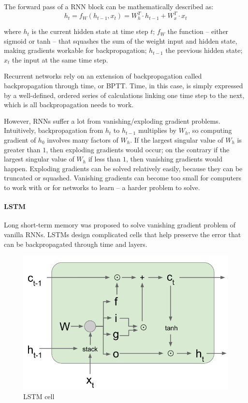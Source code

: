 \documentclass{article} %
\begin{document}
The forward pass of a RNN block can be mathematically described as:
\begin{equation}
h_t=f_W(h_{t-1},x_t)=W_h^T \cdot h_{t-1} + W_x^T \cdot x_t
\label{eqn:rnn}
\end{equation}

where $h_t$ is the current hidden state at time step $t$; $f_W$ the function -- either sigmoid or tanh -- that squashes the sum of the weight input and hidden state,  making gradients workable for backpropagation; $h_{t-1}$ the previous hidden state; $x_t$ the input at the same time step.

Recurrent networks rely on an extension of backpropagation called backpropagation through time, or BPTT. Time, in this case, is simply expressed by a well-defined, ordered series of calculations linking one time step to the next, which is all backpropagation needs to work.

However, RNNs suffer a lot from vanishing/exploding gradient problems. Intuitively, backpropagation from $h_t$ to $h_{t-1}$ multiplies by $W_h$, so computing gradient of $h_0$ involves many factors of $W_h$. If the largest singular value of $W_h$ is greater than $1$, then exploding gradients would occur; on the contrary if the largest singular value of $W_h$ if less than $1$, then vanishing gradients would happen. Exploding gradients can be solved relatively easily, because they can be truncated or squashed. Vanishing gradients can become too small for computers to work with or for networks to learn – a harder problem to solve. 

\paragraph{LSTM}
Long short-term memory was proposed to solve vanishing gradient problem of vanilla RNNs. LSTMs design complicated cells that help preserve the error that can be backpropagated through time and layers.

\begin{figure}[H]
	\centering
	\includegraphics[width=.6\textwidth]{lstm-cell.png}
	\caption{LSTM cell}
\end{figure}
\end{document}
